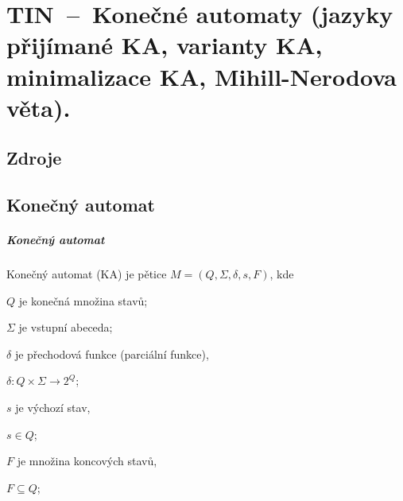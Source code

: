

\graphicspath{{tin/chomskeho_hierarchie/figures}}


\chapter{TIN~--~Konečné automaty (jazyky přijímané KA, varianty KA, minimalizace KA, Mihill-Nerodova věta).}


\section{Zdroje}

\begin{compactitem}
    \item {}
    \item {}
    \item {}
\end{compactitem}


\section{Konečný automat}

\paragraph*{Konečný automat} Konečný automat (KA) je pětice $M = (Q, \Sigma, \delta, s, F)$, kde \begin{compactitem}
    \item $Q$ je konečná množina stavů;
    \item $\Sigma$ je vstupní abeceda;
    \item $\delta$ je přechodová funkce (parciální funkce), \begin{compactitem}
        \item $\delta : Q \times \Sigma \rightarrow 2^{Q}$;
    \end{compactitem}
    \item $s$ je výchozí stav, \begin{compactitem}
        \item $s \in Q$;
    \end{compactitem}
    \item $F$ je množina koncových stavů, \begin{compactitem}
        \item $F \subseteq Q$;
    \end{compactitem}
\end{compactitem}

